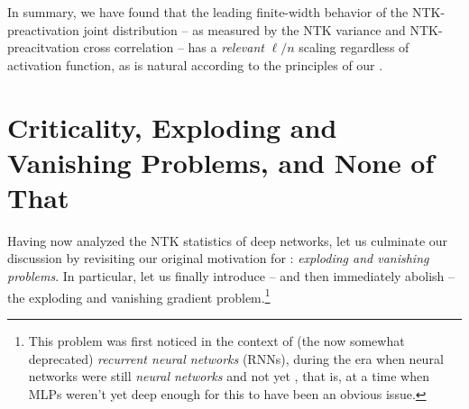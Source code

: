 In summary, we have found that the leading finite-width behavior of the NTK-preactivation joint distribution -- as measured by the NTK variance and NTK-preacitvation cross correlation -- has a \emph{relevant} $\ell/n$ scaling regardless of activation function, as is natural according to the principles of our .

\section{Criticality, Exploding and Vanishing Problems, and None of That}\label{sec:EVGP-WEP}



Having now analyzed the NTK statistics of deep networks, let us culminate our discussion by revisiting our original motivation for : \emph{exploding and vanishing problems}. In particular, let us finally introduce -- and then immediately abolish -- the exploding and vanishing gradient problem.\footnote{This problem was first noticed \cite{hochreiter1991untersuchungen,bengio-evgp-recurrent} in the context of  (the now somewhat deprecated) \emph{recurrent neural networks} (RNNs), during the era when neural networks were still \emph{neural networks} and not yet , that is, at a time when MLPs weren't yet deep enough for this to have been an obvious issue.}






